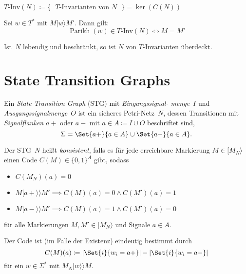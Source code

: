 \documentclass{cheat-sheet}
\newcommand{\activeTransition}[1]{[{#1}\rangle} %
\newcommand{\labelledTransition}[1]{[{#1}\rangle\rangle} %
\DeclareMathOperator{\Parikh}{Parikh} %
\newcommand{\TInv}{T\text{-}\mathrm{Inv}} %
\begin{document}
\begin{nota}
  $\TInv(N) \coloneqq \{ \text{ $T$-Invarianten von~$N$ } \} = \ker(C(N))$
\end{nota}

\begin{lem}
  Sei $w \in T^*$ mit $M \activeTransition{w} M'$.
  Dann gilt:
  \[
    \Parikh(w) \in \TInv(N) \iff M = M'
  \]
\end{lem}

\begin{satz}
  Ist~$N$ lebendig und beschränkt, so ist $N$ von $T$-Invarianten überdeckt.
\end{satz}

\section{State Transition Graphs}

\begin{defn}
  Ein \emph{State Transition Graph} (STG) mit \textit{Eingangssignal- menge}~$I$ und \textit{Ausgangssignalmenge}~$O$ ist ein sicheres Petri-Netz~$N$, dessen Transitionen mit \textit{Signalflanken} $a{+}$ oder $a{-}$ mit $a \in A \coloneqq I \cup O$ beschriftet sind, \dh{}
  \[ \Sigma = \Set{a{+}}{a \in A} \cup \Set{a{-}}{a \in A}. \]
\end{defn}

\begin{defn}
  Der STG~$N$ heißt \emph{konsistent}, falls es für jede erreichbare Markierung $M \in \activeTransition{M_N}$ einen Code $C(M) \in \{ 0, 1 \}^A$ gibt, sodass
  \begin{itemize}
    \item $C(M_N)(a) = 0$
    \item $M \labelledTransition{a{+}} M' \implies C(M)(a) = 0 \wedge C(M')(a) = 1$
    \item $M \labelledTransition{a{-}} M' \implies C(M)(a) = 1 \wedge C(M')(a) = 0$
  \end{itemize}
  für alle Markierungen $M, M' \in \activeTransition{M_N}$ und Signale $a \in A$.
\end{defn}

\begin{bem}
  Der Code ist (im Falle der Existenz) eindeutig bestimmt durch
  \[
    C(M)(a) \coloneqq \card{\Set{i}{w_i = a{+}}} - \card{\Set{i}{w_i = a{-}}}
  \]
  für ein $w \in \Sigma^*$ mit $M_N \labelledTransition{w} M$.
\end{bem}
\end{document}
